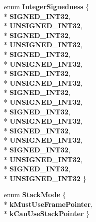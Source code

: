 \begin{DoxyCompactItemize}
\item 
enum {\bfseries Integer\+Signedness} \{ \\*
{\bfseries S\+I\+G\+N\+E\+D\+\_\+\+I\+N\+T32}, 
\\*
{\bfseries U\+N\+S\+I\+G\+N\+E\+D\+\_\+\+I\+N\+T32}, 
\\*
{\bfseries S\+I\+G\+N\+E\+D\+\_\+\+I\+N\+T32}, 
\\*
{\bfseries U\+N\+S\+I\+G\+N\+E\+D\+\_\+\+I\+N\+T32}, 
\\*
{\bfseries S\+I\+G\+N\+E\+D\+\_\+\+I\+N\+T32}, 
\\*
{\bfseries U\+N\+S\+I\+G\+N\+E\+D\+\_\+\+I\+N\+T32}, 
\\*
{\bfseries S\+I\+G\+N\+E\+D\+\_\+\+I\+N\+T32}, 
\\*
{\bfseries U\+N\+S\+I\+G\+N\+E\+D\+\_\+\+I\+N\+T32}, 
\\*
{\bfseries S\+I\+G\+N\+E\+D\+\_\+\+I\+N\+T32}, 
\\*
{\bfseries U\+N\+S\+I\+G\+N\+E\+D\+\_\+\+I\+N\+T32}, 
\\*
{\bfseries S\+I\+G\+N\+E\+D\+\_\+\+I\+N\+T32}, 
\\*
{\bfseries U\+N\+S\+I\+G\+N\+E\+D\+\_\+\+I\+N\+T32}, 
\\*
{\bfseries S\+I\+G\+N\+E\+D\+\_\+\+I\+N\+T32}, 
\\*
{\bfseries U\+N\+S\+I\+G\+N\+E\+D\+\_\+\+I\+N\+T32}, 
\\*
{\bfseries S\+I\+G\+N\+E\+D\+\_\+\+I\+N\+T32}, 
\\*
{\bfseries U\+N\+S\+I\+G\+N\+E\+D\+\_\+\+I\+N\+T32}, 
\\*
{\bfseries S\+I\+G\+N\+E\+D\+\_\+\+I\+N\+T32}, 
\\*
{\bfseries U\+N\+S\+I\+G\+N\+E\+D\+\_\+\+I\+N\+T32}
 \}\hypertarget{classv8_1_1internal_1_1_l_code_gen_a29a982d57fb7548092bffc62539543b6}{}\label{classv8_1_1internal_1_1_l_code_gen_a29a982d57fb7548092bffc62539543b6}

\item 
enum {\bfseries Stack\+Mode} \{ \\*
{\bfseries k\+Must\+Use\+Frame\+Pointer}, 
\\*
{\bfseries k\+Can\+Use\+Stack\+Pointer}
 \}\hypertarget{classv8_1_1internal_1_1_l_code_gen_a1afec001866b5a03f21a755f6317edf3}{}\label{classv8_1_1internal_1_1_l_code_gen_a1afec001866b5a03f21a755f6317edf3}


\end{DoxyCompactItemize}

